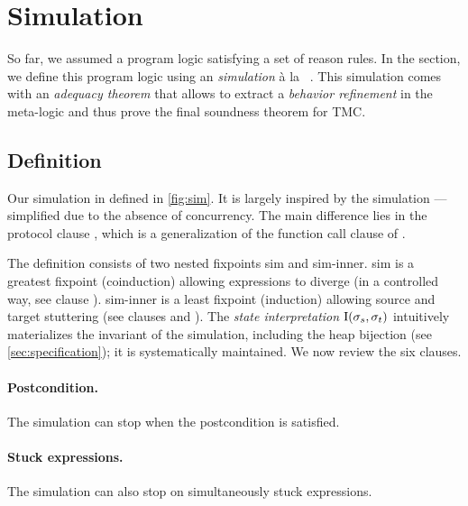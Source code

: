 \section{Simulation}
\label{sec:simulation}




So far, we assumed a program logic satisfying a set of reason rules.
In the section, we define this program logic using an \Iris \emph{simulation} à la \Simuliris~\citep*{simuliris-2022}.
This simulation comes with an \emph{adequacy theorem} that allows to extract a \emph{behavior refinement} in the meta-logic and thus prove the final soundness theorem for TMC.

\subsection{Definition}

Our simulation in defined in \cref{fig:sim}.
It is largely inspired by the \Simuliris simulation --- simplified due to the absence of concurrency.
The main difference lies in the protocol clause , which is a generalization of the function call clause of \Simuliris.

The definition consists of two nested fixpoints \textcolor{\iSimGfpColor}{sim} and \textcolor{\iSimLfpColor}{sim-inner}.
\textcolor{\iSimGfpColor}{sim} is a greatest fixpoint (coinduction) allowing expressions to diverge (in a controlled way, see clause ).
\textcolor{\iSimLfpColor}{sim-inner} is a least fixpoint (induction) allowing source and target stuttering (see clauses  and ).
The \emph{state interpretation} $\mathrm{I} (\datalangState_s, \datalangState_t)$ intuitively materializes the invariant of the simulation, including the heap bijection (see \cref{sec:specification}); it is systematically maintained.
We now review the six clauses.

\paragraph{ Postcondition.}
The simulation can stop when the postcondition is satisfied.

\paragraph{ Stuck expressions.}
The simulation can also stop on simultaneously stuck expressions.


